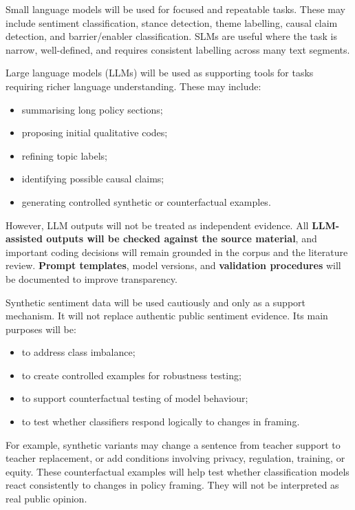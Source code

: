 \documentclass{article}
\begin{document}
Small language models will be used for focused and repeatable tasks. These may
include sentiment classification, stance detection, theme labelling, causal
claim detection, and barrier/enabler classification. SLMs are useful where the
task is narrow, well-defined, and requires consistent labelling across many text
segments.

Large language models (LLMs) will be used as supporting tools for tasks requiring
richer language understanding. These may include:

\begin{itemize}[leftmargin=*]
    \item summarising long policy sections;
    \item proposing initial qualitative codes;
    \item refining topic labels;
    \item identifying possible causal claims;
    \item generating controlled synthetic or counterfactual examples.
\end{itemize}

However, LLM outputs will not be treated as independent evidence. All
\textbf{LLM-assisted outputs will be checked against the source material}, and
important coding decisions will remain grounded in the corpus and the literature
review. \textbf{Prompt templates}, model versions, and \textbf{validation procedures}
will be documented to improve transparency.

Synthetic sentiment data will be used cautiously and only as a support
mechanism. It will not replace authentic public sentiment evidence. Its main
purposes will be:

\begin{itemize}[leftmargin=*]
    \item to address class imbalance;
    \item to create controlled examples for robustness testing;
    \item to support counterfactual testing of model behaviour;
    \item to test whether classifiers respond logically to changes in framing.
\end{itemize}

For example, synthetic variants may change a sentence from teacher support to
teacher replacement, or add conditions involving privacy, regulation, training,
or equity. These counterfactual examples will help test whether classification
models react consistently to changes in policy framing. They will not be
interpreted as real public opinion.
\end{document}
